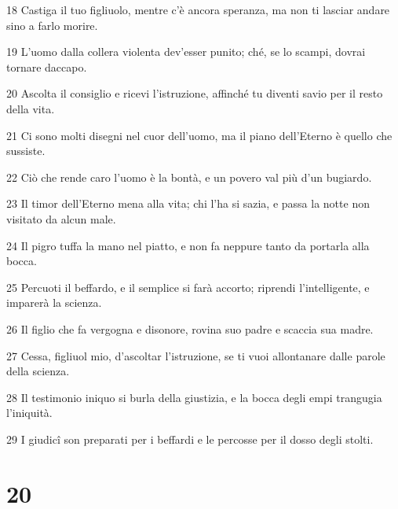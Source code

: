 \par 18 Castiga il tuo figliuolo, mentre c'è ancora speranza, ma non ti lasciar andare sino a farlo morire.
\par 19 L'uomo dalla collera violenta dev'esser punito; ché, se lo scampi, dovrai tornare daccapo.
\par 20 Ascolta il consiglio e ricevi l'istruzione, affinché tu diventi savio per il resto della vita.
\par 21 Ci sono molti disegni nel cuor dell'uomo, ma il piano dell'Eterno è quello che sussiste.
\par 22 Ciò che rende caro l'uomo è la bontà, e un povero val più d'un bugiardo.
\par 23 Il timor dell'Eterno mena alla vita; chi l'ha si sazia, e passa la notte non visitato da alcun male.
\par 24 Il pigro tuffa la mano nel piatto, e non fa neppure tanto da portarla alla bocca.
\par 25 Percuoti il beffardo, e il semplice si farà accorto; riprendi l'intelligente, e imparerà la scienza.
\par 26 Il figlio che fa vergogna e disonore, rovina suo padre e scaccia sua madre.
\par 27 Cessa, figliuol mio, d'ascoltar l'istruzione, se ti vuoi allontanare dalle parole della scienza.
\par 28 Il testimonio iniquo si burla della giustizia, e la bocca degli empi trangugia l'iniquità.
\par 29 I giudicî son preparati per i beffardi e le percosse per il dosso degli stolti.

\chapter{20}

